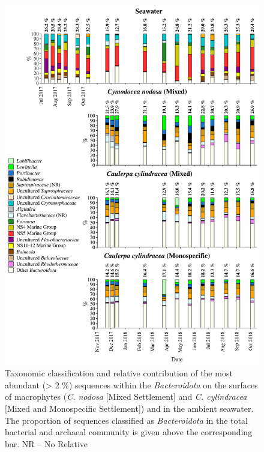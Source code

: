 \documentclass[12pt,]{article}
\begin{document}
\begin{figure}[H]

{\centering \includegraphics[width=0.85\linewidth]{../results/figures/bacteroidota_bar_plot} 

}

\caption{Taxonomic classification and relative contribution of the most abundant (> 2 \si{\percent}) sequences within the \textit{Bacteroidota} on the surfaces of macrophytes (\textit{C. nodosa} [Mixed Settlement] and \textit{C. cylindracea} [Mixed and Monospecific Settlement]) and in the ambient seawater. The proportion of sequences classified as \textit{Bacteroidota} in the total bacterial and archaeal community is given above the corresponding bar. NR -- No Relative\label{bactero}}\label{fig:unnamed-chunk-6}
\end{figure}
\end{document}
